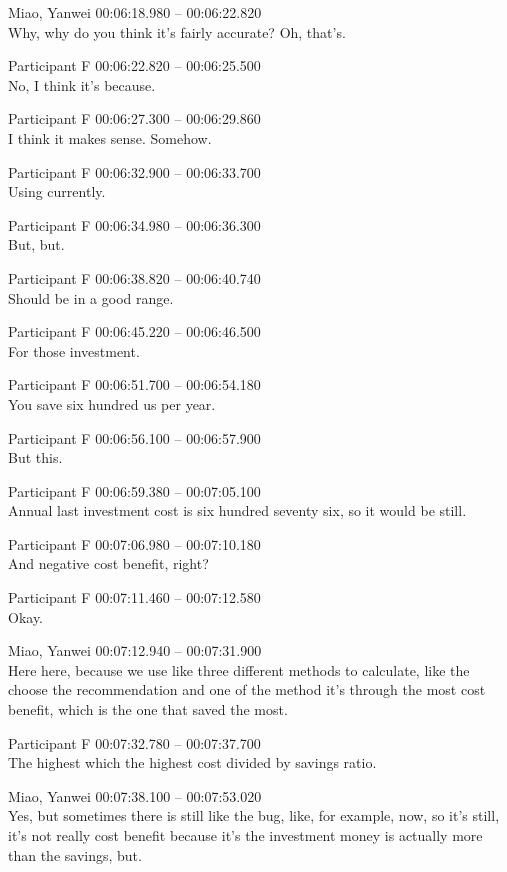 {Miao, Yanwei 00:06:18.980 -- 00:06:22.820 \\
Why, why do you think it's fairly accurate? Oh, that's.

Participant F 00:06:22.820 -- 00:06:25.500 \\
No, I think it's because.

Participant F 00:06:27.300 -- 00:06:29.860 \\
I think it makes sense. Somehow.

Participant F 00:06:32.900 -- 00:06:33.700 \\
Using currently.

Participant F 00:06:34.980 -- 00:06:36.300 \\
But, but.

Participant F 00:06:38.820 -- 00:06:40.740 \\
Should be in a good range.

Participant F 00:06:45.220 -- 00:06:46.500 \\
For those investment.

Participant F 00:06:51.700 -- 00:06:54.180 \\
You save six hundred us per year.

Participant F 00:06:56.100 -- 00:06:57.900 \\
But this.

Participant F 00:06:59.380 -- 00:07:05.100 \\
Annual last investment cost is six hundred seventy six, so it would be still.

Participant F 00:07:06.980 -- 00:07:10.180 \\
And negative cost benefit, right?

Participant F 00:07:11.460 -- 00:07:12.580 \\
Okay.

Miao, Yanwei 00:07:12.940 -- 00:07:31.900 \\
Here here, because we use like three different methods to calculate, like the choose the recommendation and one of the method it's through the most cost benefit, which is the one that saved the most.

Participant F 00:07:32.780 -- 00:07:37.700 \\
The highest which the highest cost divided by savings ratio.

Miao, Yanwei 00:07:38.100 -- 00:07:53.020 \\
Yes, but sometimes there is still like the bug, like, for example, now, so it's still, it's not really cost benefit because it's the investment money is actually more than the savings, but.

}

